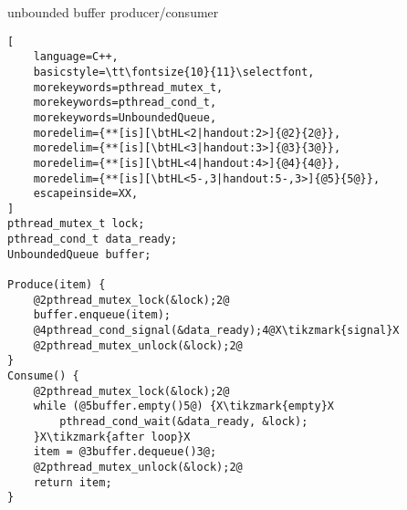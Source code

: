 \usetikzlibrary{arrows.meta,fit,matrix}

\begin{frame}[fragile,label=unboundedPC]{unbounded buffer producer/consumer}
\begin{lstlisting}[
    language=C++,
    basicstyle=\tt\fontsize{10}{11}\selectfont,
    morekeywords=pthread_mutex_t,
    morekeywords=pthread_cond_t,
    morekeywords=UnboundedQueue,
    moredelim={**[is][\btHL<2|handout:2>]{@2}{2@}}, 
    moredelim={**[is][\btHL<3|handout:3>]{@3}{3@}}, 
    moredelim={**[is][\btHL<4|handout:4>]{@4}{4@}}, 
    moredelim={**[is][\btHL<5-,3|handout:5-,3>]{@5}{5@}}, 
    escapeinside=XX,
]
pthread_mutex_t lock;
pthread_cond_t data_ready;
UnboundedQueue buffer;

Produce(item) {
    @2pthread_mutex_lock(&lock);2@
    buffer.enqueue(item);
    @4pthread_cond_signal(&data_ready);4@X\tikzmark{signal}X
    @2pthread_mutex_unlock(&lock);2@
}
Consume() {
    @2pthread_mutex_lock(&lock);2@
    while (@5buffer.empty()5@) {X\tikzmark{empty}X
        pthread_cond_wait(&data_ready, &lock);
    }X\tikzmark{after loop}X
    item = @3buffer.dequeue()3@;
    @2pthread_mutex_unlock(&lock);2@
    return item;
}
\end{lstlisting}
\end{frame}
